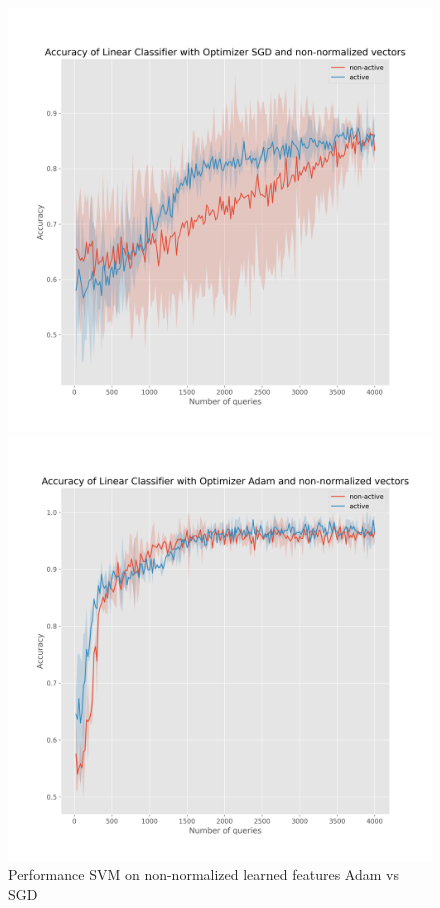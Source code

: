 \documentclass{article}
\begin{document}
\begin{figure}[t]
  \centering
  \begin{minipage}{.45\textwidth}
    \centering
    \includegraphics[width=\linewidth]{active-vs-base-moons-linear-loss-SGD-non-normalized-ci}
  \end{minipage}%
  \begin{minipage}{.45\textwidth}
    \centering
    \includegraphics[width=\linewidth]{active-vs-base-moons-linear-loss-Adam-non-normalized-ci}
  \end{minipage}
  \caption{Performance SVM on non-normalized learned features Adam vs SGD}\label{fig:svm-non-normalized-ci}
\end{figure}
\end{document}
